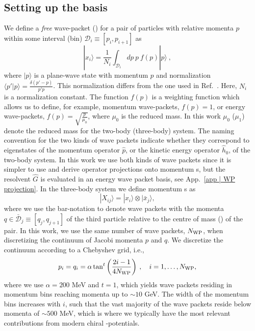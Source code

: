 \documentclass[aps,prc,showpacs,twocolumn,floatfix,nobibnotes,nofootinbib,amsmath,amssymb,longbibliography]{revtex4-2}
\begin{document}
\subsection{Setting up the \wpcd{} basis}
\label{sec | wpcd basis}
We define a \emph{free} wave-packet (\fwp) for a pair of particles
with relative momenta $p$ within some interval (bin)
$\mathcal{D}_i\equiv[p_i,p_{i+1}]$ as
\begin{equation}
	|x_i\rangle = \frac{1}{N_i}\int_{\mathcal{D}_i} dp \: p \: f(p)|p\rangle \:,
\end{equation} 
 where $|p\rangle$ is a plane-wave state with momentum $p$ and
 normalization $\langle p'|p\rangle = \frac{\delta(p'-p)}{p'p}$. This
 normalization differs from the one used in Ref.~\cite
 {Rubtsova:2015owa}. Here, $N_i$ is a normalization constant. The function $f(p)$
 is a weighting function which allows us to define, for example,
 momentum wave-packets, $f(p)=1$, or energy wave-packets, $f(p)=\sqrt{\frac
 {p}{\mu_0}}$, where $\mu_0$ is the reduced mass. In this work $\mu_0$
 ($\mu_1$) denote the reduced mass for the two-body (three-body) system. The
 naming convention for the two kinds of wave packets indicate whether they
 correspond to eigenstates of the momentum operator $\hat{p}$, or the kinetic
 energy operator $\hat{h}_0$, of the two-body system. In this work we use
 both kinds of wave packets since it is simpler to use and derive operator
 projections onto momentum \fwp{}s, but the resolvent $\hat{G}$ is evaluated
 in an energy wave packet basis, see App.~\ref{app | WP projection}. In the
 three-body system we define momentum \fwp s as
\begin{equation}
	|X_{ij}\rangle = |x_i\rangle \otimes |\bar{x}_j\rangle,
	\label{eq | general wave-packet definition}
\end{equation}
where we use the bar-notation to denote wave packets with the momenta
$q \in \bar{\mathcal{D}}_j \equiv [q_j,q_{j+1}]$ of the third particle
relative to the centre of mass (\cm{}) of the pair. In this work, we
use the same number of wave packets, $N_{\text{WP}}$, when discretizing the
continuum of Jacobi momenta $p$ and $q$. We discretize the continuum
according to a Chebyshev grid, i.e.,
\begin{equation}
  p_i=q_i = \alpha \tan^t\left(\frac{2i-1}{4N_{\text{WP}}}\right)\:,\quad i=1,\ldots,N_{\text{WP}},
\end{equation}
where we use $\alpha=200$ MeV and $t=1$, which yields wave packets
residing in momentum bins reaching momenta up to $\sim 10$ GeV. The
width of the momentum bins increases with $i$, such that the vast
majority of the wave packets reside below momenta of $\sim 500$ MeV,
which is where we typically have the most relevant contributions from
modern chiral \NN-potentials.
\end{document}

